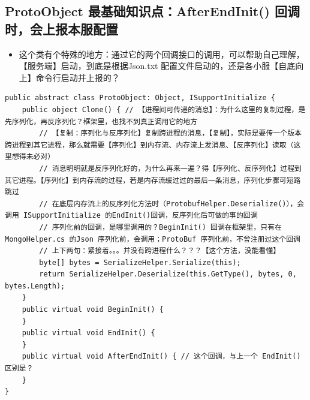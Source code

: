 \documentclass[9pt, b5paper]{article}
\begin{document}
\subsection{ProtoObject 最基础知识点：AfterEndInit() 回调时，会上报本服配置}
\label{sec:orga2fbd4b}
\begin{itemize}
\item 这个类有个特殊的地方：通过它的两个回调接口的调用，可以帮助自己理解，【服务端】启动，到底是根据Json.txt 配置文件启动的，还是各小服【自底向上】命令行启动并上报的？
\end{itemize}
\begin{verbatim}
public abstract class ProtoObject: Object, ISupportInitialize {
    public object Clone() { // 【进程间可传递的消息】：为什么这里的复制过程，是先序列化，再反序列化？框架里，也找不到真正调用它的地方
        // 【复制：序列化与反序列化】复制跨进程的消息，【复制】，实际是要传一个版本跨进程到其它进程，那么就需要【序列化】到内存流、内存流上发消息、【反序列化】读取（这里想得未必对）
        // 消息明明就是反序列化好的，为什么再来一遍？得【序列化、反序列化】过程到其它进程。【序列化】到内存流的过程，若是内存流缓过过的最后一条消息，序列化步骤可短路跳过
        // 在底层内存流上的反序列化方法时（ProtobufHelper.Deserialize()），会调用 ISupportInitialize 的EndInit()回调，反序列化后可做的事的回调
        // 序列化前的回调，是哪里调用的？BeginInit() 回调在框架里，只有在MongoHelper.cs 的Json 序列化前，会调用；ProtoBuf 序列化前，不曾注册过这个回调
        // 上下两句：紧接着。。。并没有跨进程什么？？？【这个方法，没能看懂】 
        byte[] bytes = SerializeHelper.Serialize(this);
        return SerializeHelper.Deserialize(this.GetType(), bytes, 0, bytes.Length);
    }
    public virtual void BeginInit() {
    }
    public virtual void EndInit() {
    }
    public virtual void AfterEndInit() { // 这个回调，与上一个 EndInit() 区别是？
    }
}
\end{verbatim}
\end{document}
